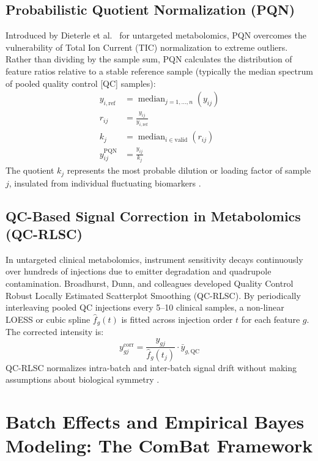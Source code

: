 \documentclass[11pt,oneside]{book}
\begin{document}
\subsection{Probabilistic Quotient Normalization (PQN)}

Introduced by Dieterle et al.~\cite{dieterle2006probabilistic} for untargeted metabolomics, PQN overcomes the vulnerability of Total Ion Current (TIC) normalization to extreme outliers. Rather than dividing by the sample sum, PQN calculates the distribution of feature ratios relative to a stable reference sample (typically the median spectrum of pooled quality control [QC] samples):
\begin{align}
y_{i,\text{ref}} &= \operatorname{median}_{j=1,\dots,n}(y_{ij}) \\
r_{ij} &= \frac{y_{ij}}{y_{i,\text{ref}}} \\
k_j &= \operatorname{median}_{i \in \text{valid}}(r_{ij}) \\
y_{ij}^{\text{PQN}} &= \frac{y_{ij}}{k_j}
\end{align}
The quotient $k_j$ represents the most probable dilution or loading factor of sample $j$, insulated from individual fluctuating biomarkers \cite{broadhurst2018guidelines}.

\subsection{QC-Based Signal Correction in Metabolomics (QC-RLSC)}
In untargeted clinical metabolomics, instrument sensitivity decays continuously over hundreds of injections due to emitter degradation and quadrupole contamination. Broadhurst, Dunn, and colleagues \cite{broadhurst2018guidelines, dunn2011procedures, want2010mass} developed Quality Control Robust Locally Estimated Scatterplot Smoothing (QC-RLSC). By periodically interleaving pooled QC injections every 5--10 clinical samples, a non-linear LOESS or cubic spline $\hat{f}_g(t)$ is fitted across injection order $t$ for each feature $g$. The corrected intensity is:
\begin{equation}
y_{gj}^{\text{corr}} = \frac{y_{gj}}{\hat{f}_g(t_j)} \cdot \bar{y}_{g,\text{QC}}
\end{equation}
QC-RLSC normalizes intra-batch and inter-batch signal drift without making assumptions about biological symmetry \cite{broadhurst2006statistical, xia2009metaboanalyst}.

\section{Batch Effects and Empirical Bayes Modeling: The ComBat Framework}
\end{document}
